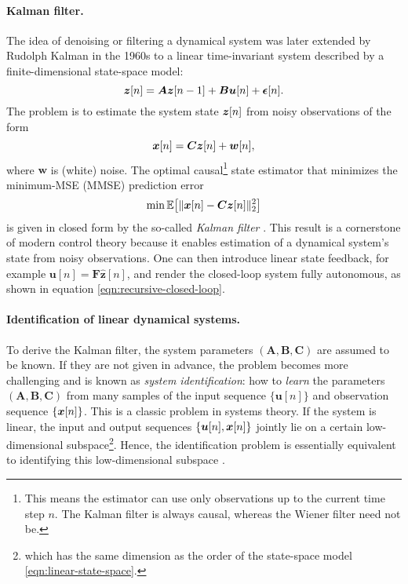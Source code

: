 \documentclass[../../book-main.tex]{subfiles}
\begin{document}
\paragraph{Kalman filter.} 
The idea of denoising or filtering a dynamical system was later extended by Rudolph Kalman in the 1960s to a linear time-invariant system described by a finite-dimensional state-space model:
\begin{equation}
    \bm{z}[n] = \boldsymbol{A} \bm{z}[n-1] + \boldsymbol{B}\boldsymbol{u}[n] + \boldsymbol{\epsilon}[n]. 
    \label{eqn:linear-state-space}
\end{equation}
The problem is to estimate the system state $\bm{z}[n]$ from noisy observations of the form
\begin{equation}
    \bm{x}[n] = \boldsymbol{C} \bm{z}[n] + \boldsymbol{w}[n],
    \label{eqn:Kalman-model}
\end{equation}
where $\boldsymbol{w}$ is (white) noise. The optimal causal\footnote{This means the estimator can use only observations up to the current time step $n$. The Kalman filter is always causal, whereas the Wiener filter need not be.} state estimator that minimizes the minimum-MSE (MMSE) prediction error
\begin{equation}
    \min \mathbb{E}\big[ \|\bm{x}[n] - \boldsymbol{C}\bm{z}[n]\|_2^2\big]
\end{equation}
is given in closed form by the so-called \textit{Kalman filter} \cite{kalman1960new}. This result is a cornerstone of modern control theory because it enables estimation of a dynamical system's state from noisy observations. One can then introduce linear state feedback, for example $\boldsymbol{u}[n] = \boldsymbol{F} \hat{\boldsymbol{z}}[n]$, and render the closed-loop system fully autonomous, as shown in equation \eqref{eqn:recursive-closed-loop}.

\paragraph{Identification of linear dynamical systems.}
To derive the Kalman filter, the system parameters $(\boldsymbol{A}, \boldsymbol{B}, \boldsymbol{C})$ are assumed to be known. If they are not given in advance, the problem becomes more challenging and is known as \textit{system identification}: how to \textit{learn} the parameters $(\boldsymbol{A}, \boldsymbol{B}, \boldsymbol{C})$ from many samples of the input sequence $\{\boldsymbol{u}[n]\}$ and observation sequence $\{\bm{x}[n]\}$. This is a classic problem in systems theory. If the system is linear, the input and output sequences $\{\boldsymbol{u}[n], \bm{x}[n]\}$ jointly lie on a certain low-dimensional subspace\footnote{which has the same dimension as the order of the state-space model \eqref{eqn:linear-state-space}.}. Hence, the identification problem is essentially equivalent to identifying this low-dimensional subspace \cite{OverscheeP1996,Liu-2009-CDC,Liu-2010-SIAM}.
\end{document}
